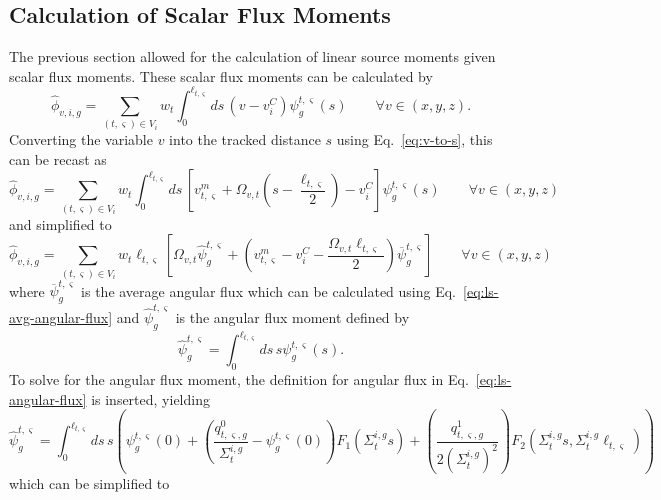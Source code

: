 \subsection{Calculation of Scalar Flux Moments}
\label{sec:ls-moments}
The previous section allowed for the calculation of linear source moments given scalar flux moments. These scalar flux moments can be calculated by
\begin{equation}
\hat{\phi}_{v,i,g} = \sum_{(t,\varsigma) \in V_i} w_t \int_{0}^{\ell_{t,\varsigma}} ds \, \left(v - v^C_i\right) \psi^{t,\varsigma}_g(s) \qquad \forall v \in (x,y,z).
\end{equation}
Converting the variable $v$ into the tracked distance $s$ using Eq.~\ref{eq:v-to-s}, this can be recast as
\begin{equation}
\hat{\phi}_{v,i,g} = \sum_{(t,\varsigma) \in V_i} w_t \int_{0}^{\ell_{t,\varsigma}} ds \, \left[v^m_{t,\varsigma} + \Omega_{v,t} \left(s - \frac{\ell_{t,\varsigma}}{2} \right) - v^C_i \right] \psi^{t,\varsigma}_g(s) \qquad \forall v \in (x,y,z)
\end{equation}
and simplified to
\begin{equation}
\hat{\phi}_{v,i,g} = \sum_{(t,\varsigma) \in V_i} w_t \ell_{t,\varsigma} \left[\Omega_{v,t} \hat{\psi}^{t,\varsigma}_g +  \left( v^m_{t,\varsigma}- v^C_i - \frac{\Omega_{v,t} \ell_{t,\varsigma}}{2} \right) \overline{\psi}^{t,\varsigma}_g \right] \qquad \forall v \in (x,y,z)
\label{eq:flux-moments-1}
\end{equation}
where $\overline{\psi}^{t,\varsigma}_g$ is the average angular flux which can be calculated using Eq.~\ref{eq:ls-avg-angular-flux} and $ \hat{\psi}^{t,\varsigma}_g$ is the angular flux moment defined by
\begin{equation}
 \hat{\psi}^{t,\varsigma}_g = \int_{0}^{\ell_{t,\varsigma}} ds \, s \psi^{t,\varsigma}_g(s).
\end{equation}
To solve for the angular flux moment, the definition for angular flux in Eq.~\ref{eq:ls-angular-flux} is inserted, yielding
\begin{equation}
\hat{\psi}^{t,\varsigma}_g = \int_{0}^{\ell_{t,\varsigma}} ds \, s \left(\psi^{t,\varsigma}_g(0) + \left( \frac{q^0_{t,\varsigma,g}}{\Sigma_{t}^{i,g}} - \psi_g^{t,\varsigma}(0) \right) F_1\left(\Sigma_{t}^{i,g} s \right) + \left(\frac{q^1_{t,\varsigma,g}}{2\left(\Sigma_{t}^{i,g}\right)^2}\right) F_2\left(\Sigma_{t}^{i,g} s, \Sigma_{t}^{i,g} \ell_{t,\varsigma} \right)\right)
\end{equation}
which can be simplified to
